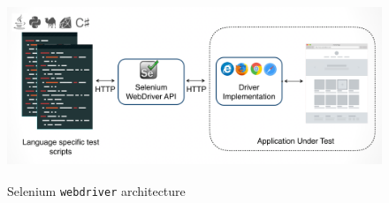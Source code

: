 \begin{figure}[h! ]
\makeatletter 
\makeatother
    \centering
  \includegraphics[width=5.5in,height=2.2in]{./Figures/webdriver_Archi}
  \caption{Selenium \texttt{webdriver} architecture}
  \label{fig:webdriverArchitecture} 
\end{figure}

